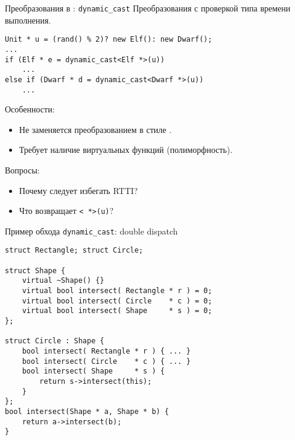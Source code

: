 \documentclass{beamer}
\begin{document}
\begin{frame}[fragile]{Преобразования в \langcpp: {\tt dynamic\_cast}}
    Преобразования с проверкой типа времени выполнения.
    \begin{lstlisting}
Unit * u = (rand() % 2)? new Elf(): new Dwarf();
...
if (Elf * e = dynamic_cast<Elf *>(u))
    ...
else if (Dwarf * d = dynamic_cast<Dwarf *>(u))
    ...        
    \end{lstlisting}
\pause    
Особенности:
    \begin{itemize}
        \item Не заменяется преобразованием в стиле \langc.
        \item Требует наличие виртуальных функций (полиморфность).
    \end{itemize}
\pause
Вопросы:
\begin{itemize}
    \item Почему следует избегать RTTI?
    \item Что возвращает {\tt {}< *>(u)}?
\end{itemize}
\end{frame}

\begin{frame}[fragile]{Пример обхода \texttt{dynamic\_cast}: double dispatch}
\begin{lstlisting}
struct Rectangle; struct Circle;

struct Shape { 
    virtual ~Shape() {} 
    virtual bool intersect( Rectangle * r ) = 0;
    virtual bool intersect( Circle    * c ) = 0;
    virtual bool intersect( Shape     * s ) = 0;
};

struct Circle : Shape {
    bool intersect( Rectangle * r ) { ... }
    bool intersect( Circle    * c ) { ... }
    bool intersect( Shape     * s ) { 
        return s->intersect(this); 
    }
};
bool intersect(Shape * a, Shape * b) { 
    return a->intersect(b); 
}
\end{lstlisting}
\end{frame}

\end{document}
